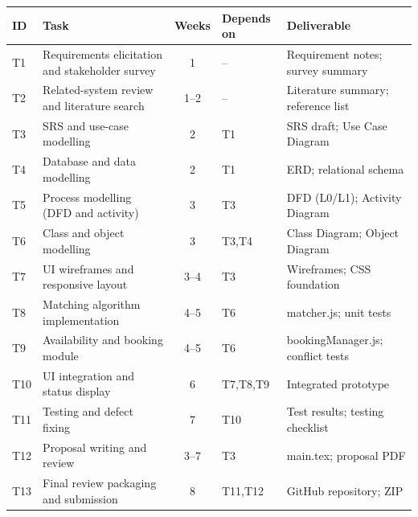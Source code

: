 \begin{longtable}{@{}p{0.6cm}p{4.6cm}c p{1.8cm} p{4.6cm}@{}}
\toprule
\textbf{ID} & \textbf{Task} & \textbf{Weeks} & \textbf{Depends on} & \textbf{Deliverable} \\ \midrule \endhead
T1 & Requirements elicitation and stakeholder survey & 1 & -- & Requirement notes; survey summary \\
T2 & Related-system review and literature search & 1--2 & -- & Literature summary; reference list \\
T3 & SRS and use-case modelling & 2 & T1 & SRS draft; Use Case Diagram \\
T4 & Database and data modelling & 2 & T1 & ERD; relational schema \\
T5 & Process modelling (DFD and activity) & 3 & T3 & DFD (L0/L1); Activity Diagram \\
T6 & Class and object modelling & 3 & T3,T4 & Class Diagram; Object Diagram \\
T7 & UI wireframes and responsive layout & 3--4 & T3 & Wireframes; CSS foundation \\
T8 & Matching algorithm implementation & 4--5 & T6 & matcher.js; unit tests \\
T9 & Availability and booking module & 4--5 & T6 & bookingManager.js; conflict tests \\
T10 & UI integration and status display & 6 & T7,T8,T9 & Integrated prototype \\
T11 & Testing and defect fixing & 7 & T10 & Test results; testing checklist \\
T12 & Proposal writing and review & 3--7 & T3 & main.tex; proposal PDF \\
T13 & Final review packaging and submission & 8 & T11,T12 & GitHub repository; ZIP \\
\bottomrule
\end{longtable}
